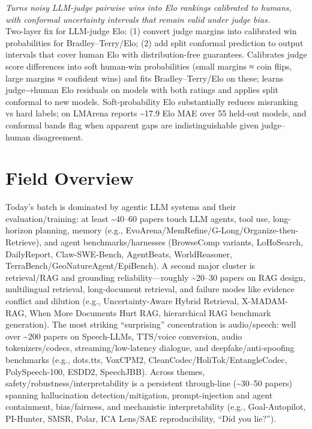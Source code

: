 \documentclass[12pt,letterpaper]{article}
\begin{document}
{\small\textit{Turns noisy LLM-judge pairwise wins into Elo rankings calibrated to humans, with conformal uncertainty intervals that remain valid under judge bias.}}\\[1pt]
{\footnotesize Two-layer fix for LLM-judge Elo: (1) convert judge margins into calibrated win probabilities for Bradley--Terry/Elo; (2) add split conformal prediction to output intervals that cover human Elo with distribution-free guarantees. Calibrates judge score differences into soft human-win probabilities (small margins ≈ coin flips, large margins ≈ confident wins) and fits Bradley--Terry/Elo on these; learns judge→human Elo residuals on models with both ratings and applies split conformal to new models. Soft-probability Elo substantially reduces misranking vs hard labels; on LMArena reports \textasciitilde{}17.9 Elo MAE over 55 held-out models, and conformal bands flag when apparent gaps are indistinguishable given judge--human disagreement.}

\medskip



\section*{Field Overview}
{\footnotesize Today's batch is dominated by agentic LLM systems and their evaluation/training: at least \textasciitilde{}40--60 papers touch LLM agents, tool use, long-horizon planning, memory (e.g., EvoArena/MemRefine/G-Long/Organize-then-Retrieve), and agent benchmarks/harnesses (BrowseComp variants, LoHoSearch, DailyReport, Claw-SWE-Bench, AgentBeats, WorldReasoner, TerraBench/GeoNatureAgent/EpiBench). A second major cluster is retrieval/RAG and grounding reliability---roughly \textasciitilde{}20--30 papers on RAG design, multilingual retrieval, long-document retrieval, and failure modes like evidence conflict and dilution (e.g., Uncertainty-Aware Hybrid Retrieval, X-MADAM-RAG, When More Documents Hurt RAG, hierarchical RAG benchmark generation). The most striking ``surprising'' concentration is audio/speech: well over \textasciitilde{}200 papers on Speech-LLMs, TTS/voice conversion, audio tokenizers/codecs, streaming/low-latency dialogue, and deepfake/anti-spoofing benchmarks (e.g., dots.tts, VoxCPM2, CleanCodec/HoliTok/EntangleCodec, PolySpeech-100, ESDD2, SpeechJBB). Across themes, safety/robustness/interpretability is a persistent through-line (\textasciitilde{}30--50 papers) spanning hallucination detection/mitigation, prompt-injection and agent containment, bias/fairness, and mechanistic interpretability (e.g., Goal-Autopilot, PI-Hunter, SMSR, Polar, ICA Lens/SAE reproducibility, ``Did you lie?'').}
\end{document}
